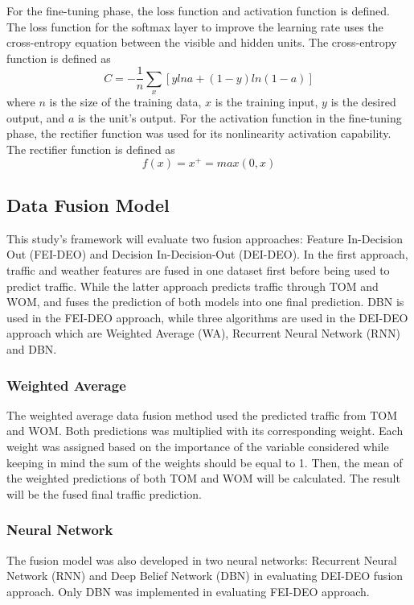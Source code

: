 For the fine-tuning phase, the loss function and activation function is defined.
The loss function for the softmax layer to improve the learning rate uses the cross-entropy equation between the visible and hidden units. The cross-entropy function is defined as 
\begin{equation}
C = -\frac{1}{n}\sum_x [y ln a + (1 - y) ln (1-a)]
\end{equation}
\noindent where $n$ is the size of the training data, $x$ is the training input, $y$ is the desired output, and $a$ is the unit’s output. 
For the activation function in the fine-tuning phase, the rectifier function was used for its nonlinearity activation capability. The rectifier function is defined as 
\begin{equation}
f(x) = x^+ = max(0, x)
\end{equation}


\subsection{Data Fusion Model}
This study’s framework will evaluate two fusion approaches: Feature In-Decision Out (FEI-DEO) and Decision In-Decision-Out (DEI-DEO). In the first approach, traffic and weather features are fused in one dataset first before being used to predict traffic. While the latter approach predicts traffic through TOM and WOM, and fuses the prediction of both models into one final prediction. DBN is used in the FEI-DEO approach, while three algorithms are used in the DEI-DEO approach which are Weighted Average (WA), Recurrent Neural Network (RNN) and DBN. 


\subsubsection{Weighted Average} 
The weighted average data fusion method used the predicted traffic from TOM and WOM. Both predictions was multiplied with its corresponding weight. Each weight was assigned based on the importance of the variable considered while keeping in mind the sum of the weights should be equal to 1. Then, the mean of the weighted predictions of both TOM and WOM will be calculated. The result will be the fused final traffic prediction.


\subsubsection{Neural Network}
The fusion model was also developed in two neural networks: Recurrent Neural Network (RNN) and Deep Belief Network (DBN) in evaluating DEI-DEO fusion approach. Only DBN was implemented in evaluating FEI-DEO approach.

